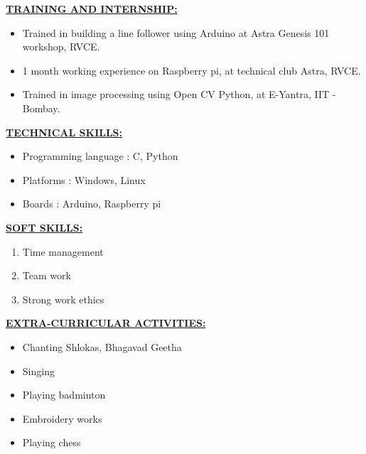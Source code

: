 \documentclass[letterpaper,11pt,oneside]{article}
\begin{document}
    \vspace{2ex}
    
    \textbf{\underline{\Large TRAINING AND INTERNSHIP:}}
    \begin{itemize}
    	\item Trained in building a line follower using Arduino at Astra Genesis 101 workshop, RVCE.
    	\item 1 month working experience on Raspberry pi, at technical club Astra, RVCE.
    	\item Trained in image processing using Open CV Python, at E-Yantra, IIT - Bombay.	
    \end{itemize}

\vspace{2ex}

\textbf{\underline{\Large TECHNICAL SKILLS:}} 
\begin{itemize}
	\item Programming language         :             C, Python
	\item Platforms                    :             Windows, Linux
	\item Boards                       :             Arduino, Raspberry pi 
\end{itemize}

\vspace{2ex}

\textbf{\underline{\Large SOFT SKILLS:}} 
\begin{enumerate}
	\item Time management
	\item Team work
	\item Strong work ethics
\end{enumerate}

\vspace{2ex}

\textbf{\underline{\Large EXTRA-CURRICULAR ACTIVITIES:}} 
\begin{itemize}
	\item Chanting Shlokas, Bhagavad Geetha
	\item Singing
	\item Playing badminton
	\item Embroidery works
	\item Playing chess
\end{itemize}
\end{document}
